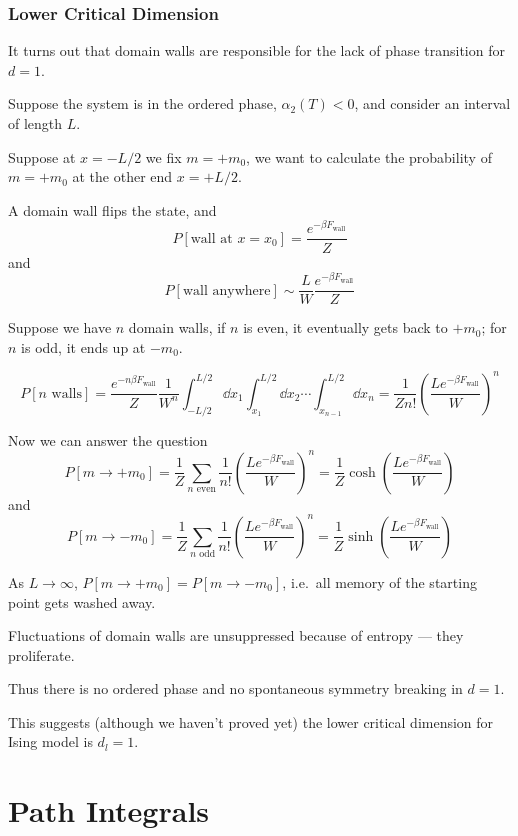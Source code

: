 \documentclass[a4paper,11pt]{article}
\begin{document}
	\subsubsection{Lower Critical Dimension}

	It turns out that domain walls are responsible for the lack of phase transition for $d = 1$.

	Suppose the system is in the ordered phase, $\alpha_2(T)<0$, and consider an interval of length $L$.

	Suppose at $x = -L/2$ we fix $m = + m_0$, we want to calculate the probability of $m = + m_0$ at the other end $x = + L/2$.


	A domain wall flips the state, and
	\[
		P[\text{wall at } x = x_0] = \frac{e ^{-\beta F _{\text{wall}}}}{Z}
	\]
	and
	\[
		P[\text{wall anywhere}] \sim \frac{L}{W} \frac{e ^{-\beta F _{\text{wall}}}}{Z}
	\]

	Suppose we have $n$ domain walls, if $n$ is even, it eventually gets back to $+m_0$; for $n$ is odd, it ends up at $- m_0$.
	
	\[
		P[n \text{ walls}] = \frac{e ^{-n \beta F _{\text{wall}}}}{Z} \frac{1}{W^n} \int_{-L/2}^{L/2} \dd{x_1} \int_{x_1}^{L/2} \dd{x_2} \cdots \int_{x _{n-1}}^{L/2} \dd{x_n} = \frac{1}{Z n!} \left( \frac{L e ^{- \beta F _{\text{wall}}}}{W} \right)^n
	\]
	
	Now we can answer the question
	\[
		P[m \to + m_0] = \frac{1}{Z} \sum _{n \text{ even}} \frac{1}{n!} \left( \frac{L e ^{- \beta F _{\text{wall}}}}{W} \right)^n = \frac{1}{Z} \cosh(\frac{L e ^{- \beta F _{\text{wall}}}}{W})
	\]
	and
	\[
		P[m \to - m_0] = \frac{1}{Z} \sum _{n \text{ odd}} \frac{1}{n!} \left( \frac{L e ^{- \beta F _{\text{wall}}}}{W} \right)^n = \frac{1}{Z} \sinh(\frac{L e ^{- \beta F _{\text{wall}}}}{W})
	\]

	As $L \to \infty$, $P[m \to + m_0] = P[m \to - m_0]$, i.e.\ all memory of the starting point gets washed away.

	Fluctuations of domain walls are unsuppressed because of entropy --- they proliferate.

	Thus there is no ordered phase and no spontaneous symmetry breaking in $d = 1$.
	
	This suggests (although we haven't proved yet) the lower critical dimension for Ising model is $d_l = 1$.

	\newpage

	\section{Path Integrals} 
	
\end{document}
